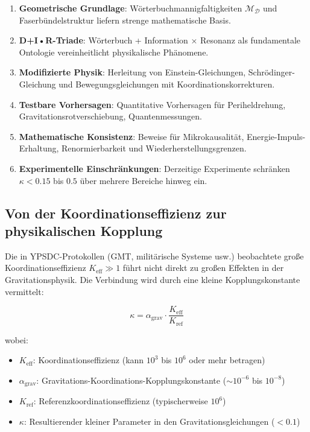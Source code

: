 \documentclass[11pt,a4paper]{article}
\begin{document}
	\begin{enumerate}
		\item \textbf{Geometrische Grundlage}: Wörterbuchmannigfaltigkeiten $\mathcal{M}_{\mathcal{D}}$ und Faserbündelstruktur liefern strenge mathematische Basis.
		
		\item \textbf{D+I•R-Triade}: Wörterbuch + Information × Resonanz als fundamentale Ontologie vereinheitlicht physikalische Phänomene.
		
		\item \textbf{Modifizierte Physik}: Herleitung von Einstein-Gleichungen, Schrödinger-Gleichung und Bewegungsgleichungen mit Koordinationskorrekturen.
		
		\item \textbf{Testbare Vorhersagen}: Quantitative Vorhersagen für Periheldrehung, Gravitationsrotverschiebung, Quantenmessungen.
		
		\item \textbf{Mathematische Konsistenz}: Beweise für Mikrokausalität, Energie-Impuls-Erhaltung, Renormierbarkeit und Wiederherstellungsgrenzen.
		
		\item \textbf{Experimentelle Einschränkungen}: Derzeitige Experimente schränken $\kappa < 0.15$ bis $0.5$ über mehrere Bereiche hinweg ein.
	\end{enumerate}
	
	
	\subsection{Von der Koordinationseffizienz zur physikalischen Kopplung}
	\label{subsec:keff-to-coupling}
	
	Die in YPSDC-Protokollen (GMT, militärische Systeme usw.) beobachtete große Koordinationseffizienz $K_{\mathrm{eff}} \gg 1$ führt nicht direkt zu großen Effekten in der Gravitationsphysik. Die Verbindung wird durch eine kleine Kopplungskonstante vermittelt:
	
	\begin{equation}
		\kappa = \alpha_{\text{grav}} \cdot \frac{K_{\mathrm{eff}}}{K_{\text{ref}}}
	\end{equation}
	
	wobei:
	\begin{itemize}
		\item $K_{\mathrm{eff}}$: Koordinationseffizienz (kann $10^3$ bis $10^6$ oder mehr betragen)
		\item $\alpha_{\text{grav}}$: Gravitations-Koordinations-Kopplungskonstante ($\sim 10^{-6}$ bis $10^{-8}$)
		\item $K_{\text{ref}}$: Referenzkoordinationseffizienz (typischerweise $10^6$)
		\item $\kappa$: Resultierender kleiner Parameter in den Gravitationsgleichungen ($< 0.1$)
	\end{itemize}
	
\end{document}
